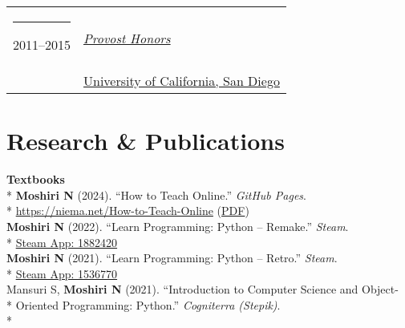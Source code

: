 \documentclass[margin,line]{res}
\begin{document}
\begin{resume}
\begin{longtable}{@{}p{0.7in}p{4in}}
\hspace*{-4mm} \rule{-1mm}{5mm} 2011--2015 & \href{https://roosevelt.ucsd.edu/academics/Academic\%20Opportunities/honors/index.html#Provost-Honors}{\textit{Provost Honors}}\\*
\hspace*{-4mm} \hspace*{-4mm} & \hspace{4mm} \href{http://ucsd.edu/}{University of California, San Diego}\\
\end{longtable}

\section{\sc Research \& Publications}
\textbf{Textbooks}\vspace{2mm}\\*
\hspace*{4mm} \textbf{Moshiri N} (2024). ``How to Teach Online.'' \textit{GitHub Pages}.\\*\vspace{2mm}
\hspace*{8mm} \href{https://niema.net/How-to-Teach-Online}{https://niema.net/How-to-Teach-Online} (\href{https://github.com/niemasd/How-to-Teach-Online/releases/latest/download/How-to-Teach-Online.pdf}{PDF})\\
\hspace*{4mm} \textbf{Moshiri N} (2022). ``Learn Programming: Python -- Remake.'' \textit{Steam}.\\*\vspace{2mm}
\hspace*{8mm} \href{https://store.steampowered.com/app/1882420}{Steam App: 1882420}\\
\hspace*{4mm} \textbf{Moshiri N} (2021). ``Learn Programming: Python -- Retro.'' \textit{Steam}.\\*\vspace{2mm}
\hspace*{8mm} \href{https://store.steampowered.com/app/1536770}{Steam App: 1536770}\\
\hspace*{4mm} Mansuri S, \textbf{Moshiri N} (2021). ``Introduction to Computer Science and Object-\\*
\hspace*{9mm} Oriented Programming: Python.'' \textit{Cogniterra (Stepik)}.\\*\vspace{2mm}

\end{resume}
\end{document}
